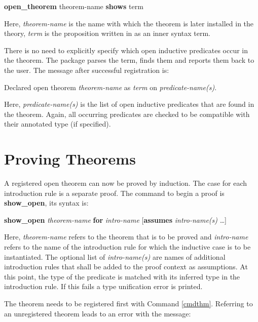 \begin{cmd} \label{cmdthm}
\textbf{open\_theorem} theorem-name \textbf{shows} term
\end{cmd}

Here, \emph{theorem-name} is the name with which the theorem is later installed in the theory, \emph{term} is the proposition written in as an inner syntax term.
%

There is no need to explicitly specify which open inductive predicates occur in the theorem.
%
The package parses the term, finds them and reports them back to the user.
%
The message after successful registration is:
%

\begin{msg}
Declared open theorem \emph{theorem-name} as \emph{term} on \emph{predicate-name(s)}.
\end{msg}

Here, \emph{predicate-name(s)} is the list of open inductive predicates that are found in the theorem.
%
Again, all occurring predicates are checked to be compatible with their annotated type (if specified).
%

\section{Proving Theorems}

A registered open theorem can now be proved by induction.
%
The case for each introduction rule is a separate proof.
%
The command to begin a proof is \textbf{show\_open}, its syntax is:
%

\begin{cmd} \label{cmdshow}
\textbf{show\_open} \textit{theorem-name} \textbf{for} \textit{intro-name} [\textbf{assumes} \textit{intro-name(s)} \dots]
\end{cmd}

Here, \emph{theorem-name} refers to the theorem that is to be proved and \emph{intro-name} refers to the name of the introduction rule for which the inductive case is to be instantiated.
%
The optional list of \emph{intro-name(s)} are names of additional introduction rules that shall be added to the proof context as assumptions.
%
At this point, the type of the predicate is matched with its inferred type in the introduction rule.
%
If this fails a type unification error is printed.
%

The theorem needs to be registered first with Command \ref{cmdthm}.
%
Referring to an unregistered theorem leads to an error with the message:
%

